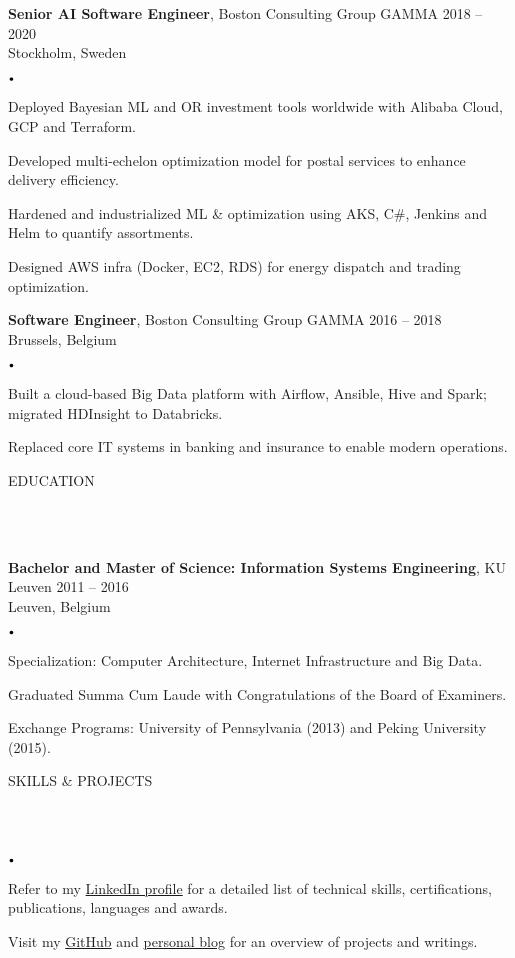 \documentclass{article}
\newcommand{\header}[1]{
    {
        \hspace*{-4pt}
        \vspace*{8pt}
        \uppercase{#1}
    }
    \vspace*{-4pt} 
    \lineunder
    \vspace*{8pt}
}
\newcommand{\lineunder}{
    \vspace*{-8pt} \\ 
    \hspace*{-4pt} 
    \hrulefill \\
}
\newcommand{\experience}[5]{
    \vspace*{2pt}
    \textbf{#1}, #2 \hfill #3 \\ 
    #4 \\
    #5
    \vspace*{2pt}
}
\newcommand{\spacedbullet}{
    $\vcenter{\hbox{\tiny$\bullet$}}$\hspace*{-2pt}
}
\newenvironment{bulletlist}{
    \begin{list}
        {\spacedbullet}{\setlength\leftmargin{10pt} 
        \topsep 0pt \itemsep -2pt}}{\vspace*{4pt}
    \end{list}
}
\begin{document}
\experience{Senior AI Software Engineer}{Boston Consulting Group GAMMA}{2018 -- 2020}{Stockholm, Sweden}
{
    \begin{bulletlist}
        \item Deployed Bayesian ML and OR investment tools worldwide with Alibaba Cloud, GCP and Terraform.
        \item Developed multi-echelon optimization model for postal services to enhance delivery efficiency.
        \item Hardened and industrialized ML \& optimization using AKS, C\#, Jenkins and Helm to quantify assortments.
        \item Designed AWS infra (Docker, EC2, RDS) for energy dispatch and trading optimization.
    \end{bulletlist}
}

\experience{Software Engineer}{Boston Consulting Group GAMMA}{2016 -- 2018}{Brussels, Belgium}
{
    \begin{bulletlist}
        \item Built a cloud-based Big Data platform with Airflow, Ansible, Hive and Spark; migrated HDInsight to Databricks.
        \item Replaced core IT systems in banking and insurance to enable modern operations.
    \end{bulletlist}
}

\vspace*{4pt}

\header{Education}
\experience{Bachelor and Master of Science: Information Systems Engineering}{KU Leuven}{2011 -- 2016}{Leuven, Belgium}
{
    \begin{bulletlist}
        \item Specialization: Computer Architecture, Internet Infrastructure and Big Data.
        \item Graduated Summa Cum Laude with Congratulations of the Board of Examiners.
        \item Exchange Programs: University of Pennsylvania (2013) and Peking University (2015).
    \end{bulletlist}
}

\vspace*{4pt}
\header{Skills \& Projects}
\begin{bulletlist}
    \item Refer to my \href{https://linkedin.com/in/nielsdegrande/}{LinkedIn profile} for a detailed list of technical skills, certifications, publications, languages and awards.
    \item Visit my \href{https://github.com/NielsDegrande/}{GitHub} and \href{https://niels.degran.de/blog}{personal blog} for an overview of projects and writings.
\end{bulletlist}
\end{document}
